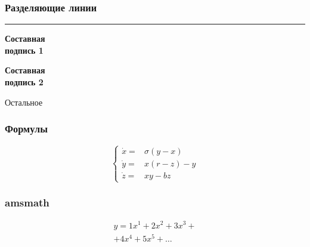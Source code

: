 \begin{frame}
    \frametitle{Разделяющие линии}
    \begin{minipage}[c]{0.47\linewidth}
        \bigskip
        \hrule{}
        \bigskip
        \textbf{Составная \\ подпись 1}
    \end{minipage}
    \hfill
    \vrule{}
    \hfill
    \begin{minipage}[c]{0.47\linewidth}
        \flushright
        \textbf{Составная \\ подпись 2}
    \end{minipage}
\end{frame}

\begin{frame}
    \begin{center}
        \Huge
        Остальное
    \end{center}
\end{frame}


\begin{frame}
    \frametitle{Формулы}
    \[
    \left\{
    \begin{array}{rl}
        \dot x = & \sigma (y-x)  \\
        \dot y = & x (r - z) - y \\
        \dot z = & xy - bz
    \end{array}
    \right.
    \]
\end{frame}

\begin{frame}
    \frametitle{amsmath}
    \centering
    \begin{minipage}[t]{0.5\linewidth}
        \begin{multline*}
            y = 1 x^1 + 2 x^2 + 3 x^3 + \\ + 4 x^4 + 5 x^5 + \dots
        \end{multline*}
    \end{minipage}
\end{frame}

